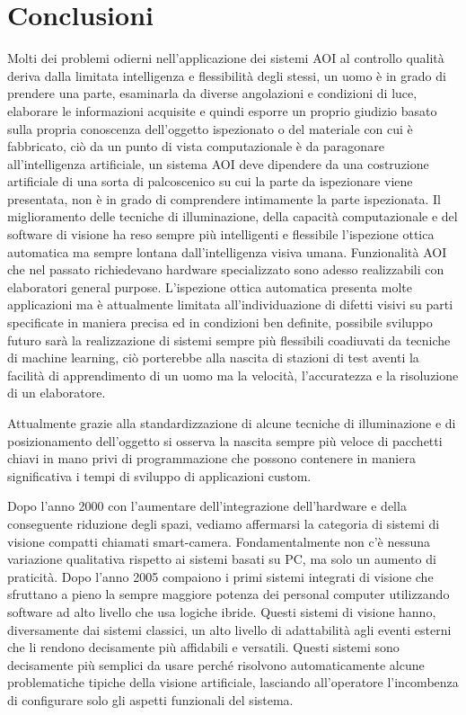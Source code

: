 \chapter{Conclusioni}
Molti dei problemi odierni nell’applicazione dei sistemi AOI al controllo qualità deriva dalla limitata
intelligenza e flessibilità degli stessi, un uomo è in grado di prendere una parte, esaminarla da diverse
angolazioni e condizioni di luce, elaborare le informazioni acquisite e quindi esporre un proprio giudizio
basato sulla propria conoscenza dell’oggetto ispezionato o del materiale con cui è fabbricato, ciò da un
punto di vista computazionale è da paragonare all’intelligenza artificiale, un sistema AOI deve dipendere
da una costruzione artificiale di una sorta di palcoscenico su cui la parte da ispezionare viene presentata,
non è in grado di comprendere intimamente la parte ispezionata.
Il miglioramento delle tecniche di illuminazione, della capacità computazionale e del software di visione
ha reso sempre più intelligenti e flessibile l’ispezione ottica automatica ma sempre lontana
dall’intelligenza visiva umana.
Funzionalità AOI che nel passato richiedevano hardware specializzato sono adesso realizzabili con
elaboratori general purpose.
L’ispezione ottica automatica presenta molte applicazioni ma è attualmente limitata all’individuazione di
difetti visivi su parti specificate in maniera precisa ed in condizioni ben definite, possibile sviluppo futuro
sarà la realizzazione di sistemi sempre più flessibili coadiuvati da tecniche di machine learning, ciò
porterebbe alla nascita di stazioni di test aventi la facilità di apprendimento di un uomo ma la velocità,
l’accuratezza e la risoluzione di un elaboratore.

Attualmente grazie alla standardizzazione di alcune tecniche di illuminazione e di posizionamento
dell’oggetto si osserva la nascita sempre più veloce di pacchetti chiavi in mano privi di programmazione
che possono contenere in maniera significativa i tempi di sviluppo di applicazioni custom.

Dopo l'anno 2000 con l'aumentare dell'integrazione dell'hardware e della conseguente riduzione degli
spazi, vediamo affermarsi la categoria di sistemi di visione compatti chiamati smart-camera.
Fondamentalmente non c'è nessuna variazione qualitativa rispetto ai sistemi basati su PC, ma solo un
aumento di praticità. Dopo l'anno 2005 compaiono i primi sistemi integrati di visione che sfruttano a
pieno la sempre maggiore potenza dei personal computer utilizzando software ad alto livello che
usa logiche ibride. Questi sistemi di visione hanno, diversamente dai sistemi classici, un alto livello di
adattabilità agli eventi esterni che li rendono decisamente più affidabili e versatili. Questi sistemi sono
decisamente più semplici da usare perché risolvono automaticamente alcune problematiche tipiche della
visione artificiale, lasciando all'operatore l'incombenza di configurare solo gli aspetti funzionali del
sistema.
\endinput